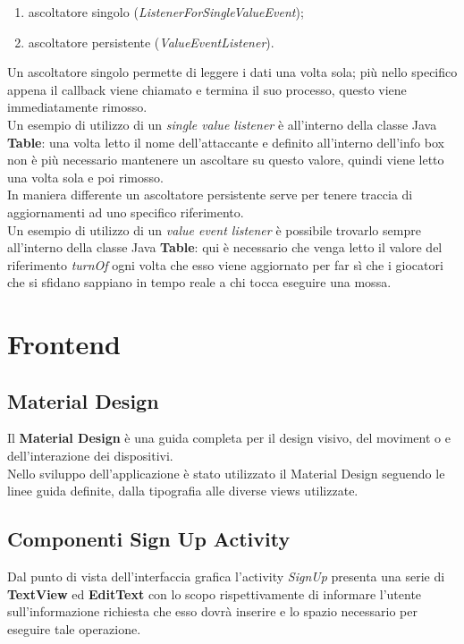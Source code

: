 \documentclass[a4paper,12pt,twoside,openright]{report}
\begin{document}
\begin{enumerate}
\item ascoltatore singolo (\textit{ListenerForSingleValueEvent});

\item ascoltatore persistente (\textit{ValueEventListener}).
\end{enumerate}

Un ascoltatore singolo permette di leggere i dati una volta sola; più nello specifico appena il callback viene chiamato e termina il suo processo, questo viene immediatamente rimosso.\\
Un esempio di utilizzo di un \textit{single value listener} è all'interno della classe Java \textbf{Table}: una volta letto il nome dell'attaccante e definito all'interno dell'info box non è più necessario mantenere un ascoltare su questo valore, quindi viene letto una volta sola e poi rimosso.\\
In maniera differente un ascoltatore persistente serve per tenere traccia di aggiornamenti ad uno specifico riferimento.\\
Un esempio di utilizzo di un \textit{value event listener} è possibile trovarlo sempre all'interno della classe Java \textbf{Table}: qui è necessario che venga letto il valore del riferimento \textit{turnOf} ogni volta che esso viene aggiornato per far sì che i giocatori che si sfidano sappiano in tempo reale a chi tocca eseguire una mossa.

\section{Frontend}
\subsection{Material Design}
Il \textbf{Material Design} è una guida completa per il design visivo, del moviment o e dell'interazione dei dispositivi.\\
Nello sviluppo dell'applicazione è stato utilizzato il Material Design seguendo le linee guida definite, dalla tipografia alle diverse views utilizzate.

\subsection{Componenti Sign Up Activity}
Dal punto di vista dell'interfaccia grafica l'activity \textit{SignUp} presenta una serie di \textbf{TextView} ed \textbf{EditText} con lo scopo rispettivamente di informare l'utente sull'informazione richiesta che esso dovrà inserire e lo spazio necessario per eseguire tale operazione.
\end{document}
